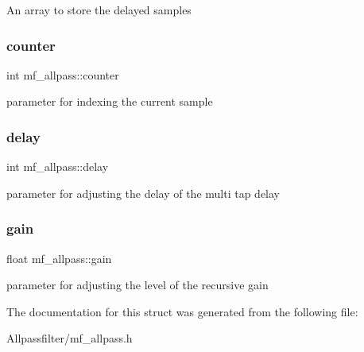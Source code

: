 An array to store the delayed samples \mbox{\label{structmf__allpass_af88b9d534b3acdede269705d2b676181}} 
\subsubsection{\texorpdfstring{counter}{counter}}
{\footnotesize\ttfamily int mf\+\_\+allpass\+::counter}

parameter for indexing the current sample \mbox{\label{structmf__allpass_a016ac476fe7e954a488af64836957787}} 
\subsubsection{\texorpdfstring{delay}{delay}}
{\footnotesize\ttfamily int mf\+\_\+allpass\+::delay}

parameter for adjusting the delay of the multi tap delay \mbox{\label{structmf__allpass_a81de95ecaee64df89e8682eee2284ffe}} 
\subsubsection{\texorpdfstring{gain}{gain}}
{\footnotesize\ttfamily float mf\+\_\+allpass\+::gain}

parameter for adjusting the level of the recursive gain 

The documentation for this struct was generated from the following file\+:\begin{DoxyCompactItemize}
\item 
Allpassfilter/mf\+\_\+allpass.\+h\end{DoxyCompactItemize}
